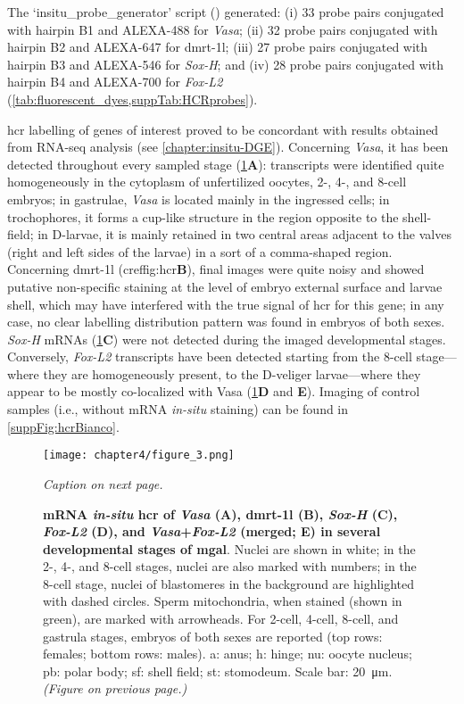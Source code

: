 The ‘insitu\_probe\_generator’ script () generated: (i) 33 probe pairs conjugated with hairpin B1 and ALEXA-488 for \textit{Vasa}; (ii) 32 probe pairs conjugated with hairpin B2 and ALEXA-647 for \gls{dmrt-1l}; (iii) 27 probe pairs conjugated with hairpin B3 and ALEXA-546 for \textit{Sox-H}; and (iv) 28 probe pairs conjugated with hairpin B4 and ALEXA-700 for \textit{Fox-L2} (\cref{tab:fluorescent_dyes,suppTab:HCRprobes}).

\gls{hcr} labelling of genes of interest proved to be concordant with results obtained from RNA-seq analysis (see \cref{chapter:insitu-DGE}). Concerning \textit{Vasa}, it has been detected throughout every sampled stage (\cref{fig:hcr}\textbf{A}): transcripts were identified quite homogeneously in the cytoplasm of unfertilized oocytes, 2-, 4-, and 8-cell embryos; in gastrulae, \textit{Vasa} is located mainly in the ingressed cells; in trochophores, it forms a cup-like structure in the region opposite to the shell-field; in D-larvae, it is mainly retained in two central areas adjacent to the valves (right and left sides of the larvae) in a sort of a comma-shaped region. Concerning \gls{dmrt-1l} (cref{fig:hcr}\textbf{B}), final images were quite noisy and showed putative non-specific staining at the level of embryo external surface and larvae shell, which may have interfered with the true signal of \gls{hcr} for this gene; in any case, no clear labelling distribution pattern was found in embryos of both sexes. \textit{Sox-H} mRNAs (\cref{fig:hcr}\textbf{C}) were not detected during the imaged developmental stages. Conversely, \textit{Fox-L2} transcripts have been detected starting from the 8-cell stage—where they are homogeneously present, to the D-veliger larvae—where they appear to be mostly co-localized with Vasa (\cref{fig:hcr}\textbf{D} and \textbf{E}). Imaging of control samples (i.e., without mRNA \textit{in-situ} staining) can be found in \cref{suppFig:hcrBianco}.

\begin{figure}
    \centering
    \texttt{[image: chapter4/figure\_3.png]}
    \caption{\textit{Caption on next page.}}
    \label{fig:hcr}
\end{figure}

\begingroup
\captionsetup[figure]{format=hruleformat}
\begin{figure}\ContinuedFloat
    \caption[]
	{
		\textbf{mRNA \textit{in-situ} \gls{hcr} of \textit{Vasa} (A), \gls{dmrt-1l} (B), \textit{Sox-H} (C), \textit{Fox-L2} (D), and \textit{Vasa}+\textit{Fox-L2} (merged; E) in several developmental stages of \gls{mgal}}. Nuclei are shown in white; in the 2-, 4-, and 8-cell stages, nuclei are also marked with numbers; in the 8-cell stage, nuclei of blastomeres in the background are highlighted with dashed circles. Sperm mitochondria, when stained (shown in green), are marked with arrowheads. For 2-cell, 4-cell, 8-cell, and gastrula stages, embryos of both sexes are reported (top rows: females; bottom rows: males). a: anus; h: hinge; nu: oocyte nucleus; pb: polar body; sf: shell field; st: stomodeum. Scale bar: \qty{20}{\um}. \textit{(Figure on previous page.)}
	}
\end{figure}
\endgroup

